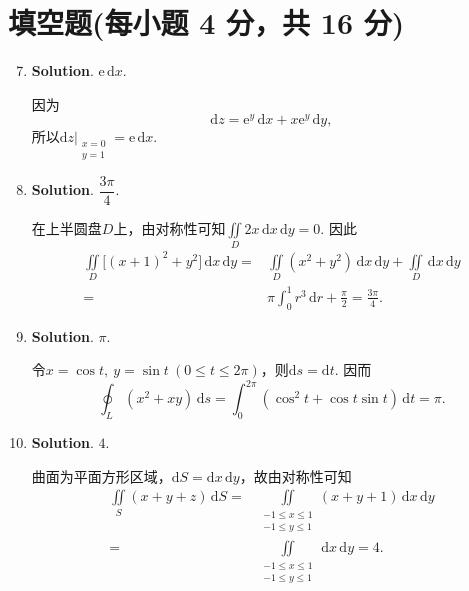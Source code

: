 \documentclass[../main.tex]{subfiles}
\begin{document}
\section{填空题(每小题 4 分，共 16 分)}
\begin{enumerate}
    \setcounter{enumi}{6}
    \item \textbf{Solution}. $\mathrm{e}\,\mathrm{d}x$.

          因为
          \[
              \mathrm{d}z=\mathrm{e}^y\,\mathrm{d}x+x\mathrm{e}^y\,\mathrm{d}y,
          \]
          所以$\mathrm{d}z\Big|_{\substack{x=0 \\ y=1}}=\mathrm{e}\,\mathrm{d}x$.

    \item \textbf{Solution}. $\dfrac{3\pi}{4}$.

          在上半圆盘$D$上，由对称性可知$\iint\limits_D2x\,\mathrm{d}x\,\mathrm{d}y=0$. 因此
          \[
              \begin{aligned}
                  \iint\limits_D\bigl[(x+1)^2+y^2\bigr]\,\mathrm{d}x\,\mathrm{d}y={} & \iint\limits_D(x^2+y^2)\,\mathrm{d}x\,\mathrm{d}y+\iint\limits_D\,\mathrm{d}x\,\mathrm{d}y \\
                  ={}                                                                & \pi\int_{0}^{1}r^3\,\mathrm{d}r+\frac{\pi}{2}=\frac{3\pi}{4}.
              \end{aligned}
          \]

    \item \textbf{Solution}. $\pi$.

          令$x=\cos t,\ y=\sin t\ (0\le t\le2\pi)$，则$\mathrm{d}s=\mathrm{d}t$. 因而
          \[
              \oint_L(x^2+xy)\,\mathrm{d}s
              =\int_0^{2\pi}(\cos^2t+\cos t\sin t)\,\mathrm{d}t=\pi.
          \]

    \item \textbf{Solution}. $4$.

          曲面为平面方形区域，$\mathrm{d}S=\mathrm{d}x\,\mathrm{d}y$，故由对称性可知
          \[
              \begin{aligned}
                  \iint\limits_S(x+y+z)\,\mathrm{d}S={} & \iint\limits_{\substack{-1\le x\le1 \\ -1\le y\le1}}(x+y+1)\,\mathrm{d}x\,\mathrm{d}y \\
                  ={}                                   & \iint\limits_{\substack{-1\le x\le1 \\ -1\le y\le1}}\,\mathrm{d}x\,\mathrm{d}y=4.
              \end{aligned}
          \]

\end{enumerate}
\end{document}
